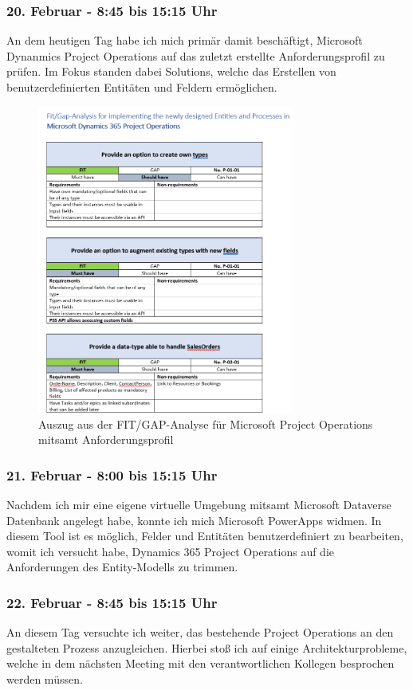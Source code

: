 \subsubsection*{20. Februar - 8:45 bis 15:15 Uhr}
An dem heutigen Tag habe ich mich primär damit beschäftigt, Microsoft Dynanmics Project Operations auf das zuletzt erstellte Anforderungsprofil zu prüfen. Im Fokus standen dabei Solutions, welche das Erstellen von benutzerdefinierten Entitäten und Feldern ermöglichen.

\begin{figure}[h]
    \centering
    \includegraphics[width=0.75\textwidth]{img/fit_gap.png}
    \caption{Auszug aus der FIT/GAP-Analyse für Microsoft Project Operations mitsamt Anforderungsprofil}
\end{figure}

\subsubsection*{21. Februar - 8:00 bis 15:15 Uhr}
Nachdem ich mir eine eigene virtuelle Umgebung mitsamt Microsoft Dataverse Datenbank angelegt habe, konnte ich mich Microsoft PowerApps widmen. In diesem Tool ist es möglich, Felder und Entitäten benutzerdefiniert zu bearbeiten, womit ich versucht habe, Dynamics 365 Project Operations auf die Anforderungen des Entity-Modells zu trimmen.

\subsubsection*{22. Februar - 8:45 bis 15:15 Uhr}
An diesem Tag versuchte ich weiter, das bestehende Project Operations an den gestalteten Prozess anzugleichen. Hierbei stoß ich auf einige Architekturprobleme, welche in dem nächsten Meeting mit den verantwortlichen Kollegen besprochen werden müssen.

